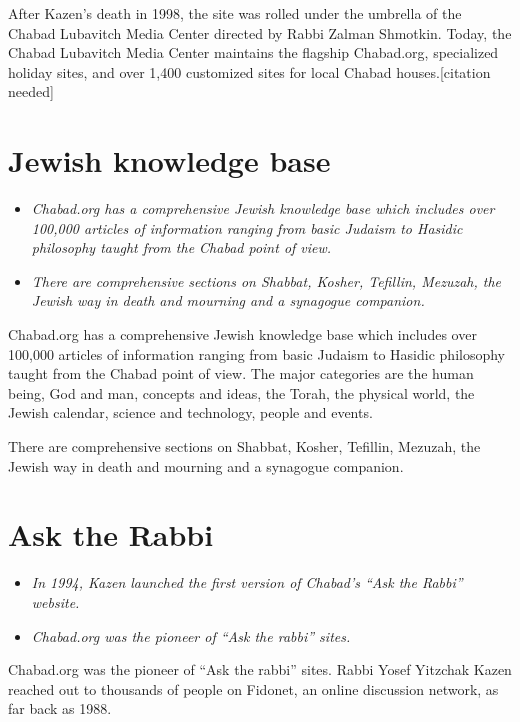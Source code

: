 After Kazen's death in 1998, the site was rolled under the umbrella of
the Chabad Lubavitch Media Center directed by Rabbi Zalman Shmotkin.
Today, the Chabad Lubavitch Media Center maintains the flagship
Chabad.org, specialized holiday sites, and over 1,400 customized sites
for local Chabad houses.{[}citation needed{]}

\section{Jewish knowledge base}\label{jewish-knowledge-base}

\begin{itemize}
\item
  \emph{Chabad.org has a comprehensive Jewish knowledge base which
  includes over 100,000 articles of information ranging from basic
  Judaism to Hasidic philosophy taught from the Chabad point of view.}
\item
  \emph{There are comprehensive sections on Shabbat, Kosher, Tefillin,
  Mezuzah, the Jewish way in death and mourning and a synagogue
  companion.}
\end{itemize}

Chabad.org has a comprehensive Jewish knowledge base which includes over
100,000 articles of information ranging from basic Judaism to Hasidic
philosophy taught from the Chabad point of view. The major categories
are the human being, God and man, concepts and ideas, the Torah, the
physical world, the Jewish calendar, science and technology, people and
events.

There are comprehensive sections on Shabbat, Kosher, Tefillin, Mezuzah,
the Jewish way in death and mourning and a synagogue companion.

\section{Ask the Rabbi}\label{ask-the-rabbi}

\begin{itemize}
\item
  \emph{In 1994, Kazen launched the first version of Chabad's ``Ask the
  Rabbi'' website.}
\item
  \emph{Chabad.org was the pioneer of ``Ask the rabbi'' sites.}
\end{itemize}

Chabad.org was the pioneer of ``Ask the rabbi'' sites. Rabbi Yosef
Yitzchak Kazen reached out to thousands of people on Fidonet, an online
discussion network, as far back as 1988.

